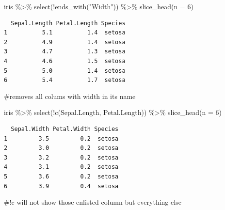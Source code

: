 \documentclass[
  letterpaper,
  DIV=11,
  numbers=noendperiod]{scrartcl}
\newenvironment{Shaded}{\begin{snugshade}}{\end{snugshade}}
\newcommand{\AttributeTok}[1]{\textcolor[rgb]{0.40,0.45,0.13}{#1}}
\newcommand{\CommentTok}[1]{\textcolor[rgb]{0.37,0.37,0.37}{#1}}
\newcommand{\DecValTok}[1]{\textcolor[rgb]{0.68,0.00,0.00}{#1}}
\newcommand{\FunctionTok}[1]{\textcolor[rgb]{0.28,0.35,0.67}{#1}}
\newcommand{\NormalTok}[1]{\textcolor[rgb]{0.00,0.23,0.31}{#1}}
\newcommand{\SpecialCharTok}[1]{\textcolor[rgb]{0.37,0.37,0.37}{#1}}
\newcommand{\StringTok}[1]{\textcolor[rgb]{0.13,0.47,0.30}{#1}}
\begin{document}
\begin{Shaded}
\begin{Highlighting}[]
\NormalTok{iris }\SpecialCharTok{\%\textgreater{}\%}
    \FunctionTok{select}\NormalTok{(}\SpecialCharTok{!}\FunctionTok{ends\_with}\NormalTok{(}\StringTok{"Width"}\NormalTok{)) }\SpecialCharTok{\%\textgreater{}\%} 
    \FunctionTok{slice\_head}\NormalTok{(}\AttributeTok{n =} \DecValTok{6}\NormalTok{)}
\end{Highlighting}
\end{Shaded}

\begin{verbatim}
  Sepal.Length Petal.Length Species
1          5.1          1.4  setosa
2          4.9          1.4  setosa
3          4.7          1.3  setosa
4          4.6          1.5  setosa
5          5.0          1.4  setosa
6          5.4          1.7  setosa
\end{verbatim}

\begin{Shaded}
\begin{Highlighting}[]
\CommentTok{\#removes all colums with width in its name}
\end{Highlighting}
\end{Shaded}

\begin{Shaded}
\begin{Highlighting}[]
\NormalTok{iris }\SpecialCharTok{\%\textgreater{}\%}
    \FunctionTok{select}\NormalTok{(}\SpecialCharTok{!}\FunctionTok{c}\NormalTok{(Sepal.Length, Petal.Length)) }\SpecialCharTok{\%\textgreater{}\%} 
    \FunctionTok{slice\_head}\NormalTok{(}\AttributeTok{n =} \DecValTok{6}\NormalTok{)}
\end{Highlighting}
\end{Shaded}

\begin{verbatim}
  Sepal.Width Petal.Width Species
1         3.5         0.2  setosa
2         3.0         0.2  setosa
3         3.2         0.2  setosa
4         3.1         0.2  setosa
5         3.6         0.2  setosa
6         3.9         0.4  setosa
\end{verbatim}

\begin{Shaded}
\begin{Highlighting}[]
\CommentTok{\#!c will not show those enlisted column but everything else}
\end{Highlighting}
\end{Shaded}
\end{document}

